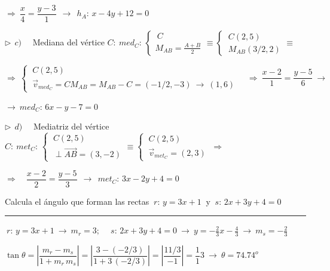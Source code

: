\begin{miejercicio}
\vspace{2mm}$\Rightarrow \ \dfrac{x}{4}=\dfrac{y-3}{1} \ \ \longrightarrow \  \ h_A:\, x-4y+12=0$

\vspace{5mm} $\triangleright \ \ c) \quad$ Mediana del vértice $C:\ med_C:\, \begin{cases} \ C \\ M_{AB}=\frac{A+B}{2} \end{cases} \equiv \begin{cases} \ C(2,5) \\ \ M_{AB}(3/2,2) \end{cases} \equiv $

\vspace{3mm} $\Rightarrow \  \begin{cases} \ C(2,5) \\ \ \vec v_{med_C}=CM_{AB}=M_{AB}-C=(-1/2,-3) \ \to \ (1,6) \end{cases} \quad \Rightarrow \ \dfrac{x-2}{1}=\dfrac{y-5}{6} \ \longrightarrow $

\vspace{2mm} $\longrightarrow  \ med_C:\, 6x-y-7=0$



\vspace{5mm} $\triangleright \ \ d) \quad$ Mediatriz del vértice $C:\ met_C:\, \begin{cases} \ C(2,5) \\ \ \perp \overrightarrow{AB}=(3,-2) \end{cases} \equiv \begin{cases} \ C(2,5) \\ \ \vec v_{met_C}=(2,3) \end{cases} \ \Rightarrow \ $

\vspace{2mm}$\Rightarrow \quad \dfrac{x-2}{2}=\dfrac{y-5}{3} \ \ \longrightarrow \ \ met_C:\, 3x-2y+4=0$	
\end{miejercicio}

\begin{miejercicio}

Calcula el ángulo que forman las rectas $\ r:\, y=3x+1 \ $ y $\ s:\, 2x+3y+4=0$

\rule{250pt}{0.1pt}

\vspace{2mm} $\ r:\, y=3x+1 \ \to \ m_r=3;\quad \ s:\, 2x+3y+4=0 \ \to \ y=-\frac 2 3 x -\frac 4 3 \ \to \ m_s=-\frac 2 3$

\vspace{2mm} $\tan \theta=\left| \dfrac{m_r-m_s}{1+m_r\, m_s} \right|=\left| \dfrac{3-(-2/3)}{1+3\, (-2/3)} \right|= \left| \dfrac{11/3}{-1} \right|=\dfrac 11 3  \ \to \ \theta=74.74^o$
	
\end{miejercicio}

